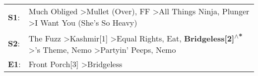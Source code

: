 \begin{supertabular}{p{0.03\textwidth}p{0.92\textwidth}}
 \textbf{S1}:  &                                                                                                                        Much Obliged\textsuperscript{} \textgreater \enspace Mullet (Over)\textsuperscript{}, \enspace FF\textsuperscript{} \textgreater \enspace All Things Ninja\textsuperscript{}, \enspace Plunger\textsuperscript{} \textgreater \enspace I Want You (She's So Heavy)\textsuperscript{}  \enspace  \\
 \textbf{S2}:  &  The Fuzz\textsuperscript{} \textgreater \enspace Kashmir[1]\textsuperscript{} \textgreater \enspace Equal Rights\textsuperscript{}, \enspace Eat\textsuperscript{}, \enspace \textbf{Bridgeless[2]\textsuperscript{$\wedge$*}} \textgreater {}'s Theme\textsuperscript{}, \enspace Nemo\textsuperscript{} \textgreater \enspace Partyin' Peeps\textsuperscript{}, \enspace Nemo\textsuperscript{}  \enspace  \\
 \textbf{E1}:  &                                                                                                                                                                                                                                                                                                                         Front Porch[3]\textsuperscript{} \textgreater \enspace Bridgeless\textsuperscript{}  \enspace  \\
\end{supertabular}
